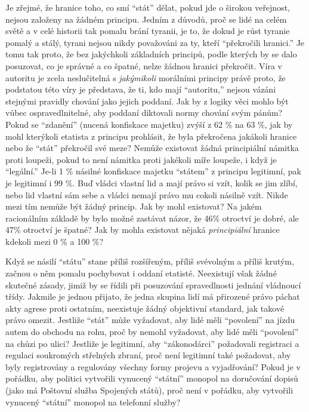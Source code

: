 \documentclass{book}
\begin{document}
Je zřejmé, že hranice toho, co smí \enquote{stát} dělat, pokud jde o širokou veřejnost, nejsou založeny na žádném principu. Jedním z důvodů, proč se lidé na celém světě a v celé historii tak pomalu brání tyranii, je to, že dokud je růst tyranie pomalý a stálý, tyrani nejsou nikdy považováni za ty, kteří \enquote{překročili hranici.} Je tomu tak proto, že bez jakýchkoli základních principů, podle kterých by se dalo posuzovat, co je správné a co špatné, nelze žádnou hranici překročit. Víra v autoritu je zcela neslučitelná s \emph{jakýmikoli} morálními principy právě proto, že podstatou této víry je představa, že ti, kdo mají \enquote{autoritu,} nejsou vázáni stejnými pravidly chování jako jejich poddaní. Jak by z logiky věci mohlo být vůbec ospravedlnitelné, aby poddaní diktovali normy chování svým pánům? Pokud se \enquote{zdanění} (nucená konfiskace majetku) zvýší z 62 \% na 63 \%, jak by mohl kterýkoli etatista z principu prohlásit, že byla překročena jakákoli hranice nebo že \enquote{stát} překročil své meze? Nemůže existovat žádná principiální námitka proti loupeži, pokud to není námitka proti jakékoli míře loupeže, i když je \enquote{legální.} Je-li 1 \% násilné konfiskace majetku \enquote{státem} z principu legitimní, pak je legitimní i 99 \%. Buď vládci vlastní lid a mají právo si vzít, kolik se jim zlíbí, nebo lid vlastní sám sebe a vládci nemají právo mu cokoli násilně vzít. Nikde mezi tím nemůže být žádný princip. Jak by mohl existovat? Na jakém racionálním základě by bylo možné zastávat názor, že 46\% otroctví je dobré, ale 47\% otroctví je špatné? Jak by mohla existovat nějaká \emph{principiální} hranice kdekoli mezi 0 \% a 100 \%?

Když se násilí \enquote{státu} stane příliš rozšířeným, příliš svévolným a příliš krutým, začnou o něm pomalu pochybovat i oddaní etatisté. Neexistují však žádné skutečné zásady, jimiž by se řídili při posuzování spravedlnosti jednání vládnoucí třídy. Jakmile je jednou přijato, že jedna skupina lidí má přirozené právo páchat akty agrese proti ostatním, neexistuje žádný objektivní standard, jak takové právo omezit. Jestliže \enquote{stát} může vyžadovat, aby lidé měli \enquote{povolení} na jízdu autem do obchodu na rohu, proč by nemohl vyžadovat, aby lidé měli \enquote{povolení} na chůzi po ulici? Jestliže je legitimní, aby \enquote{zákonodárci} požadovali registraci a regulaci soukromých střelných zbraní, proč není legitimní také požadovat, aby byly registrovány a regulovány všechny formy projevu a vyjadřování? Pokud je v pořádku, aby politici vytvořili vynucený \enquote{státní} monopol na doručování dopisů (jako má Poštovní služba Spojených států), proč není v pořádku, aby vytvořili vynucený \enquote{státní} monopol na telefonní služby?
\end{document}
